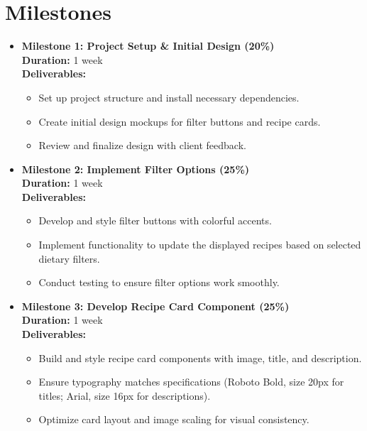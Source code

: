 \documentclass{article}
\begin{document}
\section*{Milestones}

\begin{itemize}
    \item \textbf{Milestone 1: Project Setup \& Initial Design (20\%)} \\
    \textbf{Duration:} 1 week \\
    \textbf{Deliverables:}
    \begin{itemize}
        \item Set up project structure and install necessary dependencies.
        \item Create initial design mockups for filter buttons and recipe cards.
        \item Review and finalize design with client feedback.
    \end{itemize}

    \item \textbf{Milestone 2: Implement Filter Options (25\%)} \\
    \textbf{Duration:} 1 week \\
    \textbf{Deliverables:}
    \begin{itemize}
        \item Develop and style filter buttons with colorful accents.
        \item Implement functionality to update the displayed recipes based on selected dietary filters.
        \item Conduct testing to ensure filter options work smoothly.
    \end{itemize}

    \item \textbf{Milestone 3: Develop Recipe Card Component (25\%)} \\
    \textbf{Duration:} 1 week \\
    \textbf{Deliverables:}
    \begin{itemize}
        \item Build and style recipe card components with image, title, and description.
        \item Ensure typography matches specifications (Roboto Bold, size 20px for titles; Arial, size 16px for descriptions).
        \item Optimize card layout and image scaling for visual consistency.
    \end{itemize}


\end{itemize}
\end{document}
